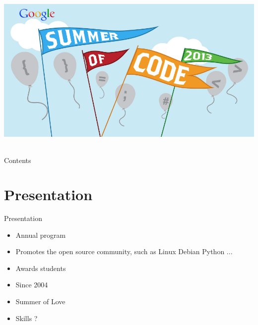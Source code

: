 \documentclass[11pt]{beamer}
\author[Erwan Douaille]{Erwan Douaille}
\institute{University of Lille 1}
\date{9th october 2013}
\begin{document}
\begin{frame} 
	\hbox{ 
     	\hspace*{2cm}
		\includegraphics[scale=0.20]{images/gsoc.jpg}
	}
	\titlepage
\end{frame}

\begin{frame}{Contents}
	\tableofcontents[]
\end{frame}      


\section{Presentation}
\begin{frame}{Presentation}
	\begin{itemize}
		\item Annual program
		\item Promotes the open source community, such as Linux Debian Python ...
		\item Awards students
		\item Since 2004
		\item Summer of Love
		\item Skills ?
	\end{itemize}
\end{frame}
\end{document}
